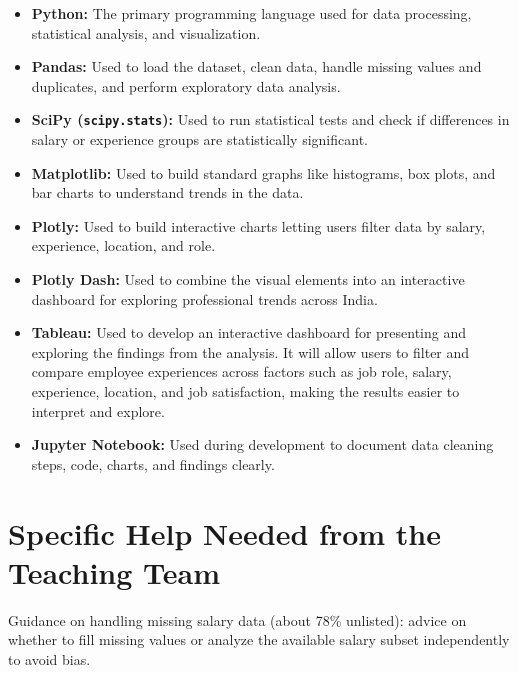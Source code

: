 \documentclass[11pt, a4paper]{article}
\begin{document}
\begin{itemize}
    \item \textbf{Python:} The primary programming language used for data processing, statistical analysis, and visualization.
    
    \item \textbf{Pandas:} Used to load the dataset, clean data, handle missing values and duplicates, and perform exploratory data analysis.
    
    \item \textbf{SciPy (\texttt{scipy.stats}):} Used to run statistical tests and check if differences in salary or experience groups are statistically significant.
    
    \item \textbf{Matplotlib:} Used to build standard graphs like histograms, box plots, and bar charts to understand trends in the data.
    
    \item \textbf{Plotly:} Used to build interactive charts letting users filter data by salary, experience, location, and role.
    
    \item \textbf{Plotly Dash:} Used to combine the visual elements into an interactive dashboard for exploring professional trends across India.

    \item \textbf{Tableau:} Used to develop an interactive dashboard for presenting and exploring the findings from the analysis. It will allow users to filter and compare employee experiences across factors such as job role, salary, experience, location, and job satisfaction, making the results easier to interpret and explore.
    
    \item \textbf{Jupyter Notebook:} Used during development to document data cleaning steps, code, charts, and findings clearly.
\end{itemize}

\section*{Specific Help Needed from the Teaching Team}

Guidance on handling missing salary data (about 78\% unlisted): advice on whether to fill missing values or analyze the available salary subset independently to avoid bias.
\end{document}
